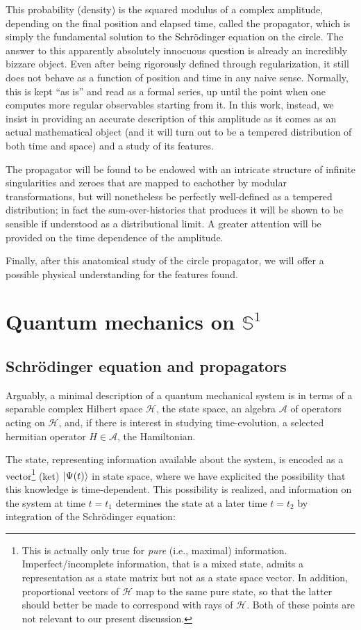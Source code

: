 \documentclass{article}
\newcommand{\ess}{\ensuremath{\mathbb{S}}}
\newcommand{\hil}{\ensuremath{\mathcal{H}}}
\begin{document}
This probability (density) is the squared modulus of a complex amplitude, depending on the final position and elapsed time, called the propagator, which is simply the fundamental solution to the Schr\"odinger equation on the circle. The answer to this apparently absolutely innocuous question is already an incredibly bizzare object. Even after being rigorously defined through regularization, it still does not behave as a function of position and time in any naive sense. Normally, this is kept ``as is'' and read as a formal series, up until the point when one computes more regular observables starting from it. In this work, instead, we insist in providing an accurate description of this amplitude as it comes as an actual mathematical object (and it will turn out to be a tempered distribution of both time and space) and a study of its features.

The propagator will be found to be endowed with an intricate structure of infinite singularities and zeroes that are mapped to eachother by modular transformations, but will nonetheless be perfectly well-defined as a tempered distribution; in fact the sum-over-histories that produces it will be shown to be sensible if understood as a distributional limit. A greater attention will be provided on the time dependence of the amplitude.

Finally, after this anatomical study of the circle propagator, we will offer a possible physical understanding for the features found.

\section{Quantum mechanics on $\ess^1$}
\subsection{Schr\"odinger equation and propagators}

Arguably, a minimal description of a quantum mechanical system is in terms of a separable complex Hilbert space $\hil$, the state space, an algebra $\mathcal{A}$ of operators acting on $\hil$, and, if there is interest in studying time-evolution, a selected hermitian operator $H \in \mathcal{A}$, the Hamiltonian.  

The state, representing information available about the system, is encoded as a vector\footnote{This is actually only true for \emph{pure} (i.e., maximal) information. Imperfect/incomplete information, that is a mixed state, admits a representation as a state matrix but not as a state space vector. In addition, proportional vectors of $\hil$ map to the same pure state, so that the latter should better be made to correspond with rays of $\hil$. Both of these points are not relevant to our present discussion.} (ket) $\ket{\Psi(t)}$ in state space, where we have explicited the possibility that this knowledge is time-dependent. This possibility is realized, and information on the system at time $t=t_1$ determines the state at a later time $t=t_2$ by integration of the Schr\"odinger equation:
\end{document}
